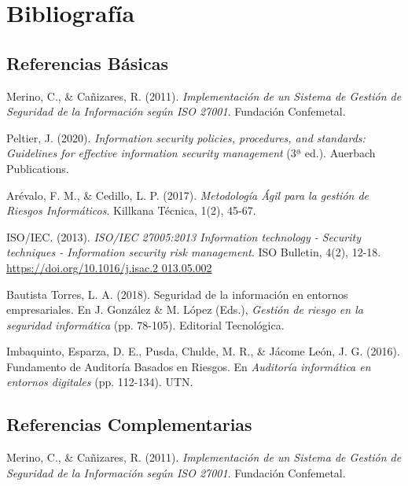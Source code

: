 \section{Bibliografía}


\subsection*{Referencias Básicas}

\hangindent=0.5in
Merino, C., \& Cañizares, R. (2011). \textit{Implementación de un Sistema de Gestión de Seguridad de la Información según ISO 27001}. Fundación Confemetal.

\hangindent=0.5in
Peltier, J. (2020). \textit{Information security policies, procedures, and standards: Guidelines for effective information security management} (3ª ed.). Auerbach Publications.

\hangindent=0.5in
Arévalo, F. M., \& Cedillo, L. P. (2017). \textit{Metodología Ágil para la gestión de Riesgos Informáticos}. Killkana Técnica, 1(2), 45-67.

\hangindent=0.5in
ISO/IEC. (2013). \textit{ISO/IEC 27005:2013 Information technology - Security techniques - Information security risk management}. ISO Bulletin, 4(2), 12-18. \href{https://doi.org/10.1016/j.isac.2013.05.002}{https://doi.org/10.1016/j.isac.2 013.05.002}

\hangindent=0.5in
Bautista Torres, L. A. (2018). Seguridad de la información en entornos empresariales. En J. González \& M. López (Eds.), \textit{Gestión de riesgo en la seguridad informática} (pp. 78-105). Editorial Tecnológica.

\hangindent=0.5in
Imbaquinto, Esparza, D. E., Pusda, Chulde, M. R., \& Jácome León, J. G. (2016). Fundamento de Auditoría Basados en Riesgos. En \textit{Auditoría informática en entornos digitales} (pp. 112-134). UTN.

\subsection*{Referencias Complementarias}

\hangindent=0.5in
Merino, C., \& Cañizares, R. (2011). \textit{Implementación de un Sistema de Gestión de Seguridad de la Información según ISO 27001}. Fundación Confemetal.

